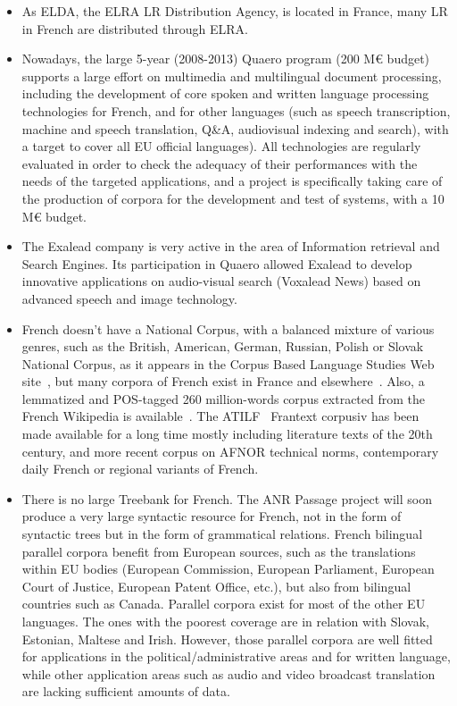\documentclass[]{../metanetpaper}
\begin{document}
\begin{multicols}{2}
\begin{itemize}
\item As ELDA, the ELRA LR Distribution Agency, is located in France, many
LR in French are distributed through ELRA.

\item Nowadays, the large 5-year (2008-2013) Quaero program (200 M€
  budget) supports a large effort on multimedia and multilingual
  document processing, including the development of core spoken and
  written language processing technologies for French, and for other
  languages (such as speech transcription, machine and speech
  translation, Q\&A, audiovisual indexing and search), with a target
  to cover all EU official languages). All technologies are regularly
  evaluated in order to check the adequacy of their performances with
  the needs of the targeted applications, and a project is
  specifically taking care of the production of corpora for the
  development and test of systems, with a 10 M€ budget.

\item The Exalead company is very active in the area of Information
retrieval and Search Engines. Its participation in Quaero allowed
Exalead to develop innovative applications on audio-visual search
(Voxalead News) based on advanced speech and image technology.

\item French doesn’t have a National Corpus, with a balanced mixture of
various genres, such as the British, American, German, Russian, Polish
or Slovak National Corpus, as it appears in the Corpus Based Language
Studies Web site~\cite{corpuslangstud}, but many corpora of French exist in France and
elsewhere~\cite{corpusfr}. Also, a lemmatized and POS-tagged 260 million-words
corpus extracted from the French Wikipedia is available~\cite{wikipediafr}. The ATILF~\cite{atilf}
Frantext corpusiv has been made available for a long time mostly
including literature texts of the 20th century, and more recent corpus
on AFNOR technical norms, contemporary daily French or regional
variants of French.

\item There is no large Treebank for French. The ANR Passage project will
soon produce a very large syntactic resource for French, not in the
form of syntactic trees but in the form of grammatical relations.
French bilingual parallel corpora benefit from European sources, such
as the translations within EU bodies (European Commission, European
Parliament, European Court of Justice, European Patent Office, etc.),
but also from bilingual countries such as Canada. Parallel corpora
exist for most of the other EU languages. The ones with the poorest
coverage are in relation with Slovak, Estonian, Maltese and
Irish. However, those parallel corpora are well fitted for
applications in the political/administrative areas and for written
language, while other application areas such as audio and video
broadcast translation are lacking sufficient amounts of data.


\end{itemize}
\end{multicols}
\end{document}
